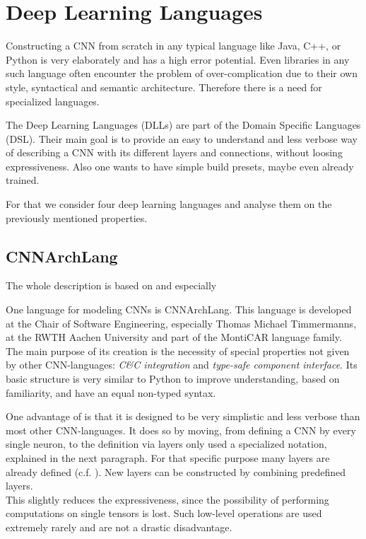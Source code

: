 \chapter{Deep Learning Languages}\label{chapter: DLL}

Constructing a CNN from scratch in any typical language like Java, C++, or Python is very elaborately and has a high error potential. Even libraries in any such language often encounter the problem of over-complication due to their own style, syntactical and semantic architecture. Therefore there is a need for specialized languages.

The Deep Learning Languages (DLLs) are part of the Domain Specific Languages (DSL). Their main goal is to provide an easy to understand and less verbose way of describing a CNN with its different layers and connections, without loosing expressiveness. Also one wants to have simple build presets, maybe even already trained.

For that we consider four deep learning languages and analyse them on the previously mentioned properties.

\section{CNNArchLang}\label{sec: CNNArch}

The whole description is based on\cite{CNNArch} and especially \cite{tim2018CNNArchLang}

One language for modeling CNNs is CNNArchLang. This language is developed at the Chair of Software Engineering, especially Thomas Michael Timmermanns,  at the RWTH Aachen University and part of the MontiCAR language family. The main purpose of its creation is the necessity of special properties not given by other CNN-languages: \textit{C\&C integration} and \textit{type-safe component interface}. Its basic structure is very similar to Python to improve understanding, based on familiarity, and have an equal non-typed syntax. 

One advantage of \cnnarch is that it is designed to be very simplistic and less verbose than most other CNN-languages. It does so by moving, from defining a CNN by every single neuron, to the definition via layers only used a specialized notation, explained in the next paragraph. For that specific purpose many layers are already defined (c.f. ). 
New layers can be constructed by combining predefined layers.\\
This slightly reduces the expressiveness, since the possibility of performing computations on single tensors is lost. Such low-level operations are used extremely rarely and are not a drastic disadvantage.

